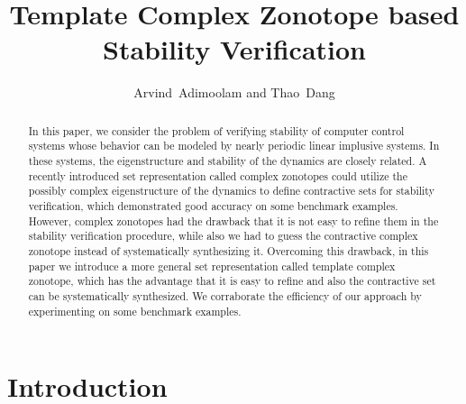 




\title{Template Complex Zonotope based Stability Verification} 

\author{Arvind\ Adimoolam and Thao\ Dang }



\maketitle


\begin{abstract}
In this paper, we consider the problem of verifying stability of
computer control systems whose behavior can be modeled by nearly
periodic linear implusive systems.  In these systems, the
eigenstructure and stability of the dynamics are closely related.  A
recently introduced set representation called complex zonotopes could
utilize the possibly complex eigenstructure of the dynamics to define
contractive sets for stability verification, which demonstrated good
accuracy on some benchmark examples.  However, complex zonotopes had
the drawback that it is not easy to refine them in the stability
verification procedure, while also we had to guess the contractive
complex zonotope instead of systematically synthesizing it.
Overcoming this drawback, in this paper we introduce a more general
set representation called template complex zonotope, which has the
advantage that it is easy to refine and also the contractive set can
be systematically synthesized.  We corraborate the efficiency of our
approach by experimenting on some benchmark examples.
\end{abstract}

\section{Introduction}


 

%  



%
%




